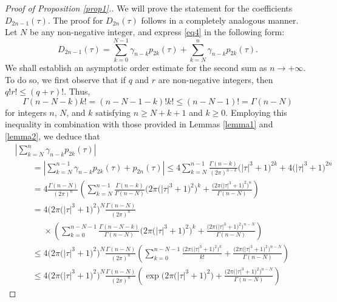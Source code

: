 \begin{proof}[Proof of Proposition \ref{prop1}.] We will prove the statement for the coefficients $D_{2n - 1} (\tau )$. The proof for $D_{2n} (\tau)$ follows in a completely analogous manner. Let $N$ be any non-negative integer, and express \eqref{eq4} in the following form:
\begin{equation}\label{eq20}
D_{2n - 1} (\tau ) = \sum_{k = 0}^{N - 1}\gamma _{n - k} p_{2k} (\tau ) + \sum_{k = N}^n \gamma _{n - k} p_{2k} (\tau ).
\end{equation}
We shall establish an asymptotic order estimate for the second sum as $n\to+\infty$. To do so, we first observe that if $q$ and $r$ are non-negative integers, then $q!r! \le (q + r)!$. Thus,
\[
\Gamma (n - N - k)k! = (n - N - 1 - k)!k! \le (n - N - 1)! = \Gamma (n - N)
\]
for integers $n$, $N$, and $k$ satisfying $n \ge N+k+1$ and $k\ge 0$. Employing this inequality in combination with those provided in Lemmas \ref{lemma1} and \ref{lemma2}, we deduce that
\begin{align*}
& \left| \sum_{k = N}^n \gamma _{n - k} p_{2k} (\tau ) \right| \\
&\qquad= \left| \sum_{k = N}^{n-1} \gamma _{n - k} p_{2k} (\tau ) + p_{2n} (\tau )\right| \le 4\sum_{k = N}^{n - 1} \frac{\Gamma (n - k)}{(2\pi )^{n - k} }\bigl(\left| \tau \right|^3 + 1\bigr)^{2k} + 4\bigl(\left| \tau \right|^3 + 1\bigr)^{2n}
\\ & \qquad= 4\frac{\Gamma (n - N)}{(2\pi )^n }\left( \sum_{k = N}^{n - 1} \frac{\Gamma (n - k)}{\Gamma(n - N)}\big(2\pi \bigl(\left| \tau \right|^3 + 1\bigr)^2 \big)^k + \frac{\big(2\pi \bigl(\left| \tau \right|^3 + 1\bigr)^2 \big)^n }{\Gamma (n - N)} \right)
\\ & \qquad= 4\big(2\pi \bigl(\left| \tau \right|^3 + 1\bigr)^2 \big)^N \frac{\Gamma(n - N)}{(2\pi )^n }\\
&\phantom{\qquad=}{}\times\left( \sum_{k = 0}^{n - N - 1} \frac{\Gamma (n - N - k)}{\Gamma (n - N)}\big(2\pi \bigl(\left| \tau \right|^3 + 1\bigr)^2 \big)^k + \frac{\big(2\pi \bigl(\left| \tau \right|^3 + 1\bigr)^2 \big)^{n - N} }{\Gamma(n - N)} \right)
\\ & \qquad\le 4\big(2\pi \bigl(\left| \tau \right|^3 + 1\bigr)^2 \big)^N \frac{\Gamma(n - N)}{(2\pi )^n }\left( \sum_{k = 0}^{n - N - 1} \frac{\big(2\pi \bigl(\left| \tau \right|^3 + 1\bigr)^2 \big)^k }{k!} + \frac{\big(2\pi \bigl(\left| \tau \right|^3 + 1\bigr)^2 \big)^{n - N} }{\Gamma(n - N)}\right)
\\ & \qquad\le 4\big(2\pi \bigl(\left| \tau \right|^3 + 1\bigr)^2 \big)^N \frac{\Gamma(n - N)}{(2\pi )^n }\left( \exp \big( 2\pi \bigl(\left| \tau \right|^3 + 1\bigr)^2 \big) + \frac{\big(2\pi \bigl(\left| \tau \right|^3 + 1\bigr)^2 \big)^{n - N} }{\Gamma(n - N)} \right)

\end{align*}
\end{proof}
